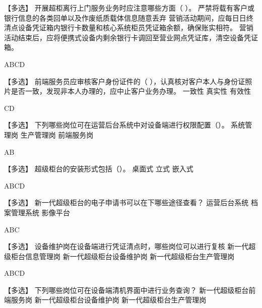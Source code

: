 \documentclass[kindlepaper]{BHCexam4kindle}
\begin{document}
\begin{questions}
\qs 【多选】 开展超柜离行上门服务业务时应注意哪些方面（  ）。 \xx
{} {  严禁将载有客户或银行信息的各类回单以及作废纸质载体信息随意丢弃 } { 营销活动期间，应每日日终清点设备凭证箱内银行卡数量和核心系统柜员凭证箱余额，确保账实相符。 } { 营销活动结束后，应将便携式设备内剩余银行卡调回至营业网点凭证库，清空设备凭证箱。 }
\begin{solution} ABCD \end{solution}
\qs 【多选】 前端服务员应审核客户身份证件的（ ），认真核对客户本人与身份证照片是否一致，发现非本人办理的，应中止客户业务办理。  \xx
{} {  一致性 } { 真实性 } { 有效性 }
\begin{solution} CD \end{solution}
\qs 【多选】 下列哪些岗位可在运营后台系统中对设备端进行权限配置（）。 \xx
{} {  系统管理岗 } { 生产管理岗 } { 前端服务岗 }
\begin{solution} AB \end{solution}
\qs 【多选】 超级柜台的安装形式包括（）。 \xx
{} {  桌面式 } { 立式 } { 嵌入式 }
\begin{solution} ABCD \end{solution}
\qs 【多选】 新一代超级柜台的电子申请书可以在下哪些途径查看？ \xx
{} {  运营后台系统 } { 档案管理系统 } { 影像平台 }
\begin{solution} ABC \end{solution}
\qs 【多选】 设备维护岗在设备端进行凭证清点时，哪些岗位可以进行复核 \xx
{} {  新一代超级柜台信息管理岗 } { 新一代超级柜台设备维护岗 } { 新一代超级柜台生产管理岗 }
\begin{solution} ABCD \end{solution}
\qs 【多选】 下列哪些岗位可在设备端清机界面中进行业务查询？ \xx
{} {  新一代超级柜台前端服务岗 } { 新一代超级柜台设备维护岗 } { 新一代超级柜台生产管理岗 }

\end{questions}
\end{document}
